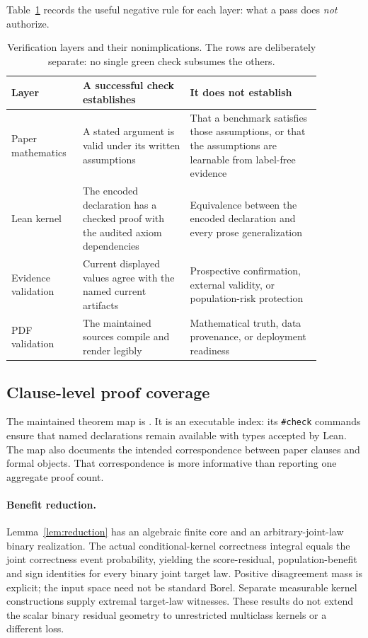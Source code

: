 Table~\ref{fr:tab-layer-boundaries} records the useful negative rule for each layer: what a pass
does \emph{not} authorize.

\begin{table}[t]
\centering
\small
\caption{Verification layers and their nonimplications.  The rows are deliberately separate: no
single green check subsumes the others.}
\label{fr:tab-layer-boundaries}
\begin{tabular}{>{\raggedright\arraybackslash}p{0.18\linewidth}
                >{\raggedright\arraybackslash}p{0.31\linewidth}
                >{\raggedright\arraybackslash}p{0.38\linewidth}}
\toprule
Layer & A successful check establishes & It does not establish \\
\midrule
Paper mathematics & A stated argument is valid under its written assumptions & That a benchmark
satisfies those assumptions, or that the assumptions are learnable from label-free evidence \\
Lean kernel & The encoded declaration has a checked proof with the audited axiom dependencies &
Equivalence between the encoded declaration and every prose generalization \\
Evidence validation & Current displayed values agree with the named current artifacts &
Prospective confirmation, external validity, or population-risk protection \\
PDF validation & The maintained sources compile and render legibly & Mathematical truth, data
provenance, or deployment readiness \\
\bottomrule
\end{tabular}
\end{table}

\subsection{Clause-level proof coverage}
\label{fr:clause-coverage}

The maintained theorem map is .  It is an executable index: its
\texttt{\#check} commands ensure that named declarations remain available with types accepted by
Lean.  The map also documents the intended correspondence between paper clauses and formal
objects.  That correspondence is more informative than reporting one aggregate proof count.

\paragraph{Benefit reduction.}
Lemma~\ref{lem:reduction} has an algebraic finite core and an arbitrary-joint-law binary
realization. The actual conditional-kernel correctness integral equals the joint correctness
event probability, yielding the score-residual, population-benefit and sign identities for every
binary joint target law. Positive disagreement mass is explicit; the input space need not be
standard Borel. Separate measurable kernel constructions supply extremal target-law witnesses.
These results do not extend the scalar binary residual geometry to unrestricted multiclass
kernels or a different loss.

